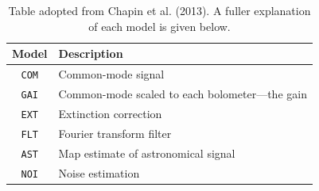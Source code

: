 \documentclass[twoside,11pt]{article}
\newenvironment{latexonly}{}{}
\renewcommand{\_}{\texttt{\symbol{95}}}
\begin{document}
\begin{latexonly}
\setlength{\extrarowheight}{3pt}
\begin{table}[t!]
\centering
\begin{tabular}{c|l}
\hline
\textbf{Model} &\hspace{0.2cm} \textbf{Description} \\
\hline
\texttt{COM}&\hspace{0.2cm} Common-mode signal\\
\texttt{GAI}&\hspace{0.2cm} Common-mode scaled to each bolometer---the gain\\
\texttt{EXT}&\hspace{0.2cm} Extinction correction\\
\texttt{FLT}&\hspace{0.2cm} Fourier transform filter\\
\texttt{AST}&\hspace{0.2cm} Map estimate of astronomical signal\\
\texttt{NOI}&\hspace{0.2cm} Noise estimation\\
\hline
\end{tabular}
\label{tab:mods}
\caption{\small Table adopted from Chapin et al. (2013). A fuller
explanation of each model is given below.}
\end{table}
\end{latexonly}
\end{document}
